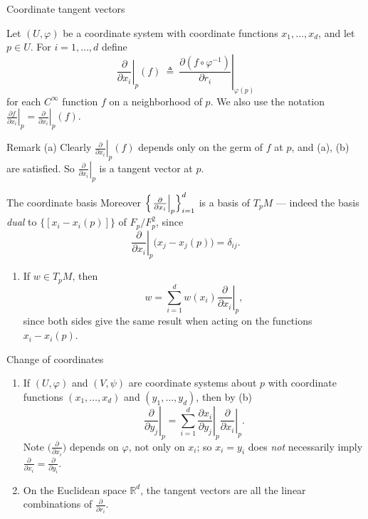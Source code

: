 \documentclass[10pt]{beamer}
\newcommand{\R}{\mathbb{R}}
\begin{document}
\begin{frame}{Coordinate tangent vectors}
	\begin{definition}
		Let $(U, \varphi)$ be a coordinate system with coordinate functions
		$x_1, \dots, x_d$, and let $p \in U$. For $i = 1, \dots, d$ define
		\[
			\left. \frac{\partial}{\partial x_i} \right|_{p} (f)
			\ \triangleq\
			\left. \frac{\partial (f \circ \varphi^{-1})}{\partial r_i}
			\right|_{\varphi(p)}
		\]
		for each $C^\infty$ function $f$ on a neighborhood of $p$. We also
		use the notation
		$\left. \frac{\partial f}{\partial x_i} \right|_{p}
			= \left. \frac{\partial}{\partial x_i} \right|_{p} (f)$.
	\end{definition}
	\begin{block}{Remark (a)}
		Clearly $\left. \frac{\partial}{\partial x_i} \right|_{p}(f)$
		depends only on the germ of $f$ at $p$, and (a), (b) are satisfied.
		So $\left. \frac{\partial}{\partial x_i} \right|_{p}$ is a tangent
		vector at $p$.
	\end{block}
\end{frame}

\begin{frame}{The coordinate basis}
	Moreover
	$\Bigl\{ \left. \frac{\partial}{\partial x_i} \right|_{p}
		\Bigr\}_{i=1}^{d}$ is a basis of $T_p M$ --- indeed the basis
	\emph{dual} to $\bigl\{ [x_i - x_i(p)] \bigr\}$ of $F_p / F_p^2$,
	since
	\[
		\left. \frac{\partial}{\partial x_i} \right|_{p}
		\bigl(x_j - x_j(p)\bigr) = \delta_{ij}.
	\]
	\begin{enumerate}
		\item[(b)] If $w \in T_p M$, then
		      \[
			      w = \sum_{i=1}^{d} w(x_i)
			      \left. \frac{\partial}{\partial x_i} \right|_{p},
		      \]
		      since both sides give the same result when acting on the
		      functions $x_i - x_i(p)$.
	\end{enumerate}
\end{frame}

\begin{frame}{Change of coordinates}
	\begin{enumerate}
		\item[(c)] If $(U, \varphi)$ and $(V, \psi)$ are coordinate systems
		      about $p$ with coordinate functions $(x_1, \dots, x_d)$ and
		      $(y_1, \dots, y_d)$, then by (b)
		      \[
			      \left. \frac{\partial}{\partial y_j} \right|_{p}
			      = \sum_{i=1}^{d} \left. \frac{\partial x_i}{\partial y_j}
			      \right|_{p} \left. \frac{\partial}{\partial x_i} \right|_{p}.
		      \]
		      Note $\bigl( \frac{\partial}{\partial x_i} \bigr)$ depends on
		      $\varphi$, not only on $x_i$; so $x_i = y_i$ does
		      \emph{not} necessarily imply
		      $\frac{\partial}{\partial x_i} = \frac{\partial}{\partial y_i}$.
		\item[(d)] On the Euclidean space $\R^d$, the tangent vectors are
		      all the linear combinations of $\frac{\partial}{\partial r_i}$.
	\end{enumerate}
\end{frame}
\end{document}
